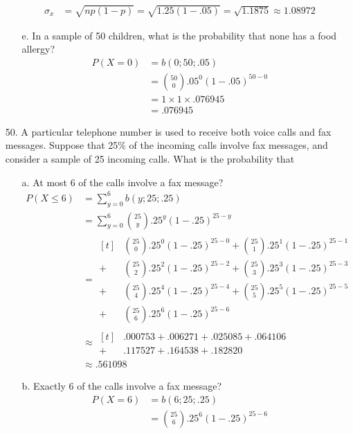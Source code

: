 \documentclass[letterpaper,12pt]{article}
\newcommand{\bp}[3]{%
  \binom{#2}{#1}#3^#1(1 - #3)^{#2 - #1}%
}
\begin{document}
\begin{enumerate}
\begin{enumerate}
\begin{align*}
          \sigma_x &= \sqrt{np(1 - p)} = \sqrt{1.25(1 - .05)} = \sqrt{1.1875} \approx 1.08972
        \end{align*}
      \item[e.]
        In a sample of 50 children, what is the probability that none has a food allergy?
        \begin{align*}
          P(X = 0) &= b(0; 50; .05) \\\
          &= \bp{0}{50}{.05} \\
          &= 1 \times 1 \times .076945 \\
          &= .076945
        \end{align*}
    \end{enumerate}
  \item[50.]
    A particular telephone number is used to receive both voice calls and fax messages. Suppose that 25\% of the incoming calls involve fax messages, and consider a sample of 25 incoming calls. What is the probability that
    \begin{enumerate}
      \item[a.]
        At most 6 of the calls involve a fax message?
        \begin{align*}
          P(X \le 6) &= \sum_{y = 0}^6 b(y; 25; .25) \\
          &= \sum_{y = 0}^6 \bp{y}{25}{.25} \\
          &= \begin{aligned}[t]
              &\bp{0}{25}{.25} + \bp{1}{25}{.25} \\
            + &\bp{2}{25}{.25} + \bp{3}{25}{.25} \\
            + &\bp{4}{25}{.25} + \bp{5}{25}{.25} \\
            + &\bp{6}{25}{.25}
          \end{aligned} \\
          &\approx \begin{aligned}[t]
              &.000753 + .006271 + .025085 + .064106 \\
            + &.117527 + .164538 + .182820
          \end{aligned} \\
          &\approx .561098
        \end{align*}
      \item[b.]
        Exactly 6 of the calls involve a fax message?
        \begin{align*}
          P(X = 6) &= b(6; 25; .25) \\
          &= \bp{6}{25}{.25} \\

\end{align*}
\end{enumerate}
\end{enumerate}
\end{document}
